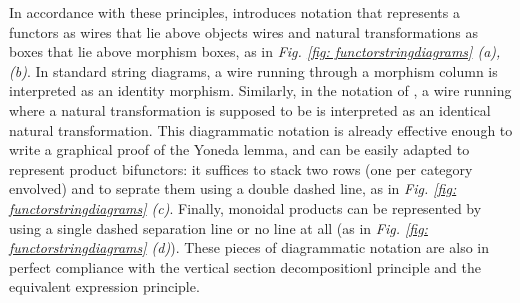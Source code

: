 \documentclass[11pt,a4paper,openright,twoside]{report}
\theoremstyle{plain}
\theoremstyle{definition}
\begin{document}
In accordance with these principles, \cite{abbott2023robust} introduces notation that represents a functors as wires that lie above objects wires and natural transformations as boxes that lie above morphism boxes, as in \textit{Fig. \ref{fig: functorstringdiagrams} (a), (b)}. In standard string diagrams, a wire running through a morphism column is interpreted as an identity morphism. Similarly, in the notation of \cite{abbott2023robust}, a wire running where a natural transformation is supposed to be is interpreted as an identical natural transformation. This diagrammatic notation is already effective enough to write a graphical proof of the Yoneda lemma, and can be easily adapted to represent product bifunctors: it suffices to stack two rows (one per category envolved) and to seprate them using a double dashed line, as in \textit{Fig. \ref{fig: functorstringdiagrams} (c)}. Finally, monoidal products can be represented by using a single dashed separation line or no line at all (as in \textit{Fig. \ref{fig: functorstringdiagrams} (d)}). These pieces of diagrammatic notation are also in perfect compliance with the vertical section decompositionl principle and the equivalent expression principle.
\end{document}
